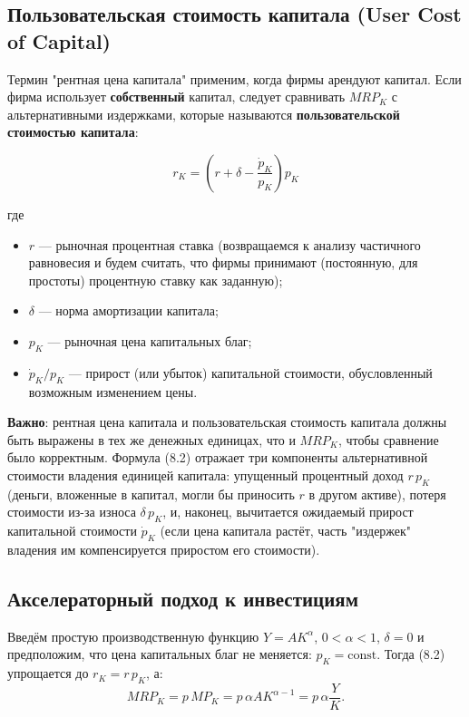 \documentclass[10pt,a4paper]{article}
\begin{document}
\subsection{Пользовательская стоимость капитала (User Cost of Capital)}

Термин "рентная цена капитала" применим, когда фирмы арендуют капитал. Если фирма использует \textbf{собственный} капитал, следует сравнивать $MRP_K$ с альтернативными издержками, которые называются \textbf{пользовательской стоимостью капитала}:
\begin{formulabox}
\begin{equation}
r_K = \left(r + \delta - \frac{\dot p_K}{p_K}\right) p_K \tag{8.2}
\end{equation}
\end{formulabox}
где
\begin{itemize}[leftmargin=1.3em]
\item $r$ — рыночная процентная ставка (возвращаемся к анализу частичного равновесия и будем считать, что фирмы принимают (постоянную, для простоты) процентную ставку как заданную);
\item $\delta$ — норма амортизации капитала;
\item $p_K$ — рыночная цена капитальных благ;
\item $\dot p_K/p_K$ — прирост (или убыток) капитальной стоимости, обусловленный возможным изменением цены.
\end{itemize}

\begin{intuition}
\textbf{Важно}: рентная цена капитала и пользовательская стоимость капитала должны быть выражены в тех же денежных единицах, что и $MRP_K$, чтобы сравнение было корректным. Формула (8.2) отражает три компоненты альтернативной стоимости владения единицей капитала: упущенный процентный доход $r\,p_K$ (деньги, вложенные в капитал, могли бы приносить $r$ в другом активе), потеря стоимости из-за износа $\delta\,p_K$, и, наконец, вычитается ожидаемый прирост капитальной стоимости $\dot p_K$ (если цена капитала растёт, часть "издержек" владения им компенсируется приростом его стоимости).
\end{intuition}

\subsection{Акселераторный подход к инвестициям}

Введём простую производственную функцию $Y = AK^{\alpha}$, $0<\alpha<1$, $\delta = 0$ и предположим, что цена капитальных благ не меняется: $p_K = \text{const}$. Тогда (8.2) упрощается до $r_K = r\,p_K$, а:
$$MRP_K = p\,MP_K = p\,\alpha A K^{\alpha-1} = p\,\alpha\frac{Y}{K}.$$
\end{document}
